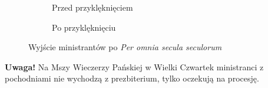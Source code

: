 		\newpage
	
		\begin{figure}[ht]
			\begin{subfigure}[t]{.5\linewidth}
				\centering{}%
				\caption{Przed przyklęknięciem}
				\label{fig:wyjscie_1}
			\end{subfigure}\qquad
			\begin{subfigure}[t]{.5\linewidth}
				\centering\usebox{\imagebox}
				\caption{Po przyklęknięciu}
				\label{fig:wyjscie_2}
			\end{subfigure}
			\caption{Wyjście ministrantów po \textit{Per omnia secula seculorum}}
		\end{figure}
	
		\textbf{Uwaga!} Na Mszy Wieczerzy Pańskiej w Wielki Czwartek ministranci z
		pochodniami nie wychodzą z prezbiterium, tylko oczekują na procesję.
		
		
    
 